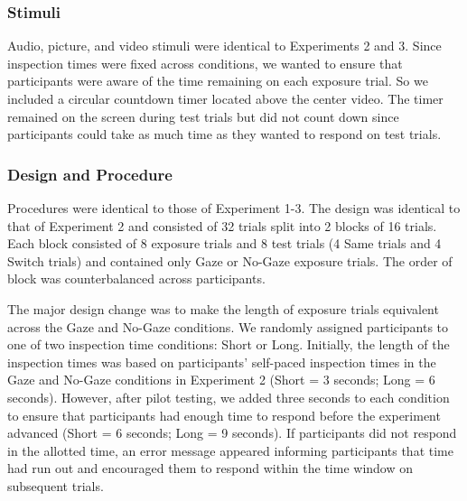 \documentclass[oneside]{report}
\begin{document}
\subsubsection{Stimuli}\label{stimuli-3}

Audio, picture, and video stimuli were identical to Experiments 2 and 3.
Since inspection times were fixed across conditions, we wanted to ensure
that participants were aware of the time remaining on each exposure
trial. So we included a circular countdown timer located above the
center video. The timer remained on the screen during test trials but
did not count down since participants could take as much time as they
wanted to respond on test trials.

\subsubsection{Design and Procedure}\label{design-and-procedure-3}

Procedures were identical to those of Experiment 1-3. The design was
identical to that of Experiment 2 and consisted of 32 trials split into
2 blocks of 16 trials. Each block consisted of 8 exposure trials and 8
test trials (4 Same trials and 4 Switch trials) and contained only Gaze
or No-Gaze exposure trials. The order of block was counterbalanced
across participants.

The major design change was to make the length of exposure trials
equivalent across the Gaze and No-Gaze conditions. We randomly assigned
participants to one of two inspection time conditions: Short or Long.
Initially, the length of the inspection times was based on participants'
self-paced inspection times in the Gaze and No-Gaze conditions in
Experiment 2 (Short = 3 seconds; Long = 6 seconds). However, after pilot
testing, we added three seconds to each condition to ensure that
participants had enough time to respond before the experiment advanced
(Short = 6 seconds; Long = 9 seconds). If participants did not respond
in the allotted time, an error message appeared informing participants
that time had run out and encouraged them to respond within the time
window on subsequent trials.
\end{document}
